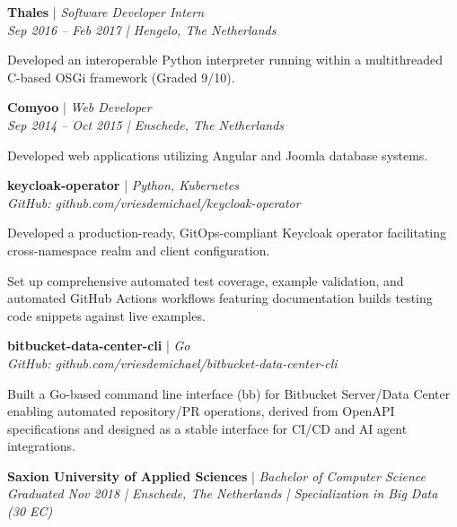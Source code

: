 \documentclass[a4paper]{deedy-resume} %
\begin{document}
\noindent \textbf{Thales} | \textit{Software Developer Intern} \\
\textit{Sep 2016 – Feb 2017 | Hengelo, The Netherlands}
\begin{tightitemize}
\item Developed an interoperable Python interpreter running within a multithreaded C-based OSGi framework (Graded 9/10).
\end{tightitemize}
\vspace{10pt}

\noindent \textbf{Comyoo} | \textit{Web Developer} \\
\textit{Sep 2014 – Oct 2015 | Enschede, The Netherlands}
\begin{tightitemize}
\item Developed web applications utilizing Angular and Joomla database systems.
\end{tightitemize}


\noindent \textbf{keycloak-operator} | \textit{Python, Kubernetes} \\
\textit{GitHub: github.com/vriesdemichael/keycloak-operator}
\begin{tightitemize}
\item Developed a production-ready, GitOps-compliant Keycloak operator facilitating cross-namespace realm and client configuration.
\item Set up comprehensive automated test coverage, example validation, and automated GitHub Actions workflows featuring documentation builds testing code snippets against live examples.
\end{tightitemize}
\vspace{10pt}

\noindent \textbf{bitbucket-data-center-cli} | \textit{Go} \\
\textit{GitHub: github.com/vriesdemichael/bitbucket-data-center-cli}
\begin{tightitemize}
\item Built a Go-based command line interface (bb) for Bitbucket Server/Data Center enabling automated repository/PR operations, derived from OpenAPI specifications and designed as a stable interface for CI/CD and AI agent integrations.
\end{tightitemize}


\noindent \textbf{Saxion University of Applied Sciences} | \textit{Bachelor of Computer Science} \\
\textit{Graduated Nov 2018 | Enschede, The Netherlands | Specialization in Big Data (30 EC)}
\vspace{10pt}
\end{document}
